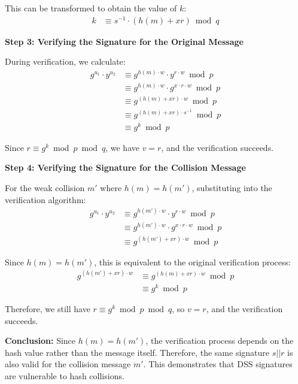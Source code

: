 \documentclass[11pt]{article}
\begin{document}
\begin{description}
\begin{itemize}
This can be transformed to obtain the value of $k$:
\begin{align}
k &\equiv s^{-1} \cdot (h(m) + xr) \bmod q
\end{align}

\vspace{0.2cm}
\noindent \textbf{Step 3: Verifying the Signature for the Original Message}

During verification, we calculate:
\begin{align}
g^{u_1} \cdot y^{u_2} &\equiv g^{h(m) \cdot w} \cdot y^{r \cdot w} \bmod p\\
&\equiv g^{h(m) \cdot w} \cdot g^{x \cdot r \cdot w} \bmod p\\
&\equiv g^{(h(m) + xr) \cdot w} \bmod p\\
&\equiv g^{(h(m) + xr) \cdot s^{-1}} \bmod p\\
&\equiv g^k \bmod p
\end{align}

Since $r \equiv g^k \bmod p \bmod q$, we have $v = r$, and the verification succeeds.

\vspace{0.2cm}
\noindent \textbf{Step 4: Verifying the Signature for the Collision Message}

For the weak collision $m'$ where $h(m) = h(m')$, substituting into the verification algorithm:
\begin{align}
g^{u_1} \cdot y^{u_2} &\equiv g^{h(m') \cdot w} \cdot y^{r \cdot w} \bmod p\\
&\equiv g^{h(m') \cdot w} \cdot g^{x \cdot r \cdot w} \bmod p\\
&\equiv g^{(h(m') + xr) \cdot w} \bmod p
\end{align}

Since $h(m) = h(m')$, this is equivalent to the original verification process:
\begin{align}
g^{(h(m') + xr) \cdot w} &\equiv g^{(h(m) + xr) \cdot w} \bmod p\\
&\equiv g^k \bmod p
\end{align}

Therefore, we still have $r \equiv g^k \bmod p \bmod q$, so $v = r$, and the verification succeeds.

\vspace{0.2cm}
\noindent \textbf{Conclusion:} Since $h(m) = h(m')$, the verification process depends on the hash value rather than the message itself. Therefore, the same signature $s||r$ is also valid for the collision message $m'$. This demonstrates that DSS signatures are vulnerable to hash collisions.



\end{itemize}
\end{description}
\end{document}
